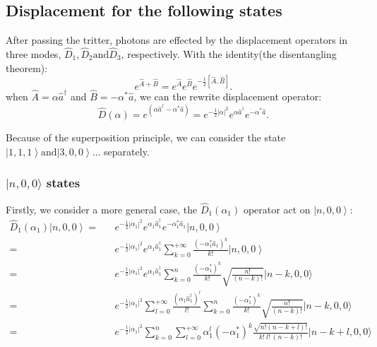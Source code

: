 \documentclass[%
 reprint,
 amsmath,amssymb,
 aps,
onecolumn
]{revtex4-2}
\begin{document}
\subsection{Displacement for the following states}
After passing the tritter, photons are effected by the displacement operators
in three modes, $\hat{D}_1, \hat{D}_2 \text{and} \hat{D}_3$, respectively.
With the identity(the disentangling theorem):
\begin{equation}
  e^{\hat{A}+\hat{B}}=e^{\hat{A}}e^{\hat{B}}e^{-\frac{1}{2}\left[\hat{A},\hat{B}\right]} .
\end{equation}
when $\hat{A}=\alpha\hat{a}^\dagger$ and $\hat{B}=-\alpha^*\hat{a}$,
we can the rewrite displacement operator:
\begin{equation}
  \hat{D}(\alpha) = e^{(\alpha\hat{a}^\dagger-\alpha^*\hat{a})}
  = e^{-\frac{1}{2}|\alpha|^2}e^{\alpha\hat{a}^\dagger}e^{-\alpha^*\hat{a}} .
\end{equation}

Because of the superposition principle, we can consider the state 
$ \left|1,1,1\right\rangle \text{and} \left|3,0,0\right\rangle\dots $ separately.
\subsubsection{ $|n,0,0\rangle$ states}
Firstly, we consider a more general case,
the $\hat{D}_1(\alpha_1)$ operator act on $\left|n,0,0\right\rangle$:
\begin{eqnarray}
  \hat{D}_1(\alpha_1) \left|n,0,0\right\rangle =&&
  e^{-\frac{1}{2}|\alpha_1|^2}e^{\alpha_1\hat{a}_1^\dagger}e^{-\alpha_1^*\hat{a}_1}
  \left|n,0,0\right\rangle \nonumber \\
  =&& e^{-\frac{1}{2}|\alpha_1|^2}e^{\alpha_1\hat{a}_1^\dagger}
  \sum_{k=0}^{+\infty}\frac{{(-\alpha_1^*\hat{a}_1)}^k}{k!} 
  \left|n,0,0\right\rangle  \nonumber \\
  =&& e^{-\frac{1}{2}|\alpha_1|^2}e^{\alpha_1\hat{a}_1^\dagger}
  \sum_{k=0}^{n}\frac{{(-\alpha_1^*)}^k}{k!} \sqrt{\frac{n!}{(n-k)!}}
  |n-k,0,0\rangle \nonumber \\
  =&& e^{-\frac{1}{2}|\alpha_1|^2} 
  \sum_{l=0}^{+\infty}\frac{{(\alpha_1\hat{a}_1^\dagger)}^l}{l!}
  \sum_{k=0}^{n}\frac{{(-\alpha_1^*)}^k}{k!} \sqrt{\frac{n!}{(n-k)!}}
  |n-k,0,0\rangle 
  \nonumber \\
  =&& e^{-\frac{1}{2}|\alpha_1|^2} \sum_{k=0}^{n} \sum_{l=0}^{+\infty}
  \alpha_1^l {(-\alpha_1^*)}^k \frac{\sqrt{n!(n-k+l)!}}{k!~l!~(n-k)!}
  |n-k+l,0,0\rangle 
  \label{D1|n00}
\end{eqnarray}
\end{document}

